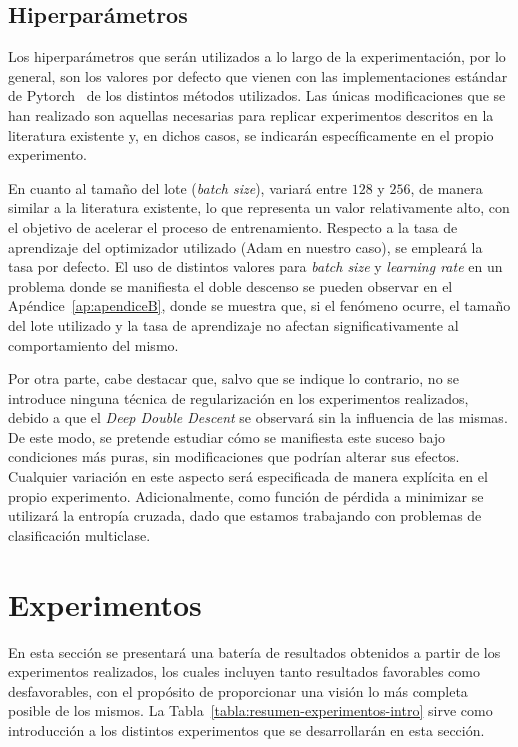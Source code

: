 \subsection{Hiperparámetros}\label{subsec:hiperparametros}

Los hiperparámetros que serán utilizados a lo largo de la experimentación, por lo general, son los valores por defecto que vienen con las implementaciones estándar de Pytorch~\cite{NEURIPS2019_9015} de los distintos métodos utilizados. Las únicas modificaciones que se han realizado son aquellas necesarias para replicar experimentos descritos en la literatura existente y, en dichos casos, se indicarán específicamente en el propio experimento.\newline

En cuanto al tamaño del lote (\textit{batch size}), variará entre $128$ y $256$, de manera similar a la literatura existente, lo que representa un valor relativamente alto, con el objetivo de acelerar el proceso de entrenamiento. Respecto a la tasa de aprendizaje del optimizador utilizado (Adam en nuestro caso), se empleará la tasa por defecto. El uso de distintos valores para \textit{batch size} y \textit{learning rate} en un problema donde se manifiesta el doble descenso se pueden observar en el Apéndice~\ref{ap:apendiceB}, donde se muestra que, si el fenómeno ocurre, el tamaño del lote utilizado y la tasa de aprendizaje no afectan significativamente al comportamiento del mismo.\newline

Por otra parte, cabe destacar que, salvo que se indique lo contrario, no se introduce ninguna técnica de regularización en los experimentos realizados, debido a que el \textit{Deep Double Descent} se observará sin la influencia de las mismas. De este modo, se pretende estudiar cómo se manifiesta este suceso bajo condiciones más puras, sin modificaciones que podrían alterar sus efectos. Cualquier variación en este aspecto será especificada de manera explícita en el propio experimento. Adicionalmente, como función de pérdida a minimizar se utilizará la entropía cruzada, dado que estamos trabajando con problemas de clasificación multiclase.\newline

\section{Experimentos}\label{sec:experimentos}

En esta sección se presentará una batería de resultados obtenidos a partir de los experimentos realizados, los cuales incluyen tanto resultados favorables como desfavorables, con el propósito de proporcionar una visión lo más completa posible de los mismos. La Tabla~\ref{tabla:resumen-experimentos-intro} sirve como introducción a los distintos experimentos que se desarrollarán en esta sección.\newline


